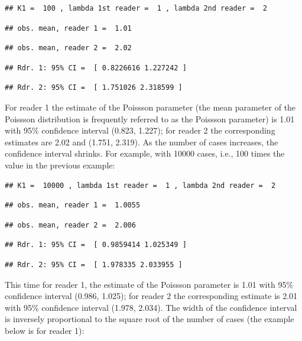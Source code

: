 \documentclass[
]{book}
\begin{document}
\begin{verbatim}
## K1 =  100 , lambda 1st reader =  1 , lambda 2nd reader =  2
\end{verbatim}

\begin{verbatim}
## obs. mean, reader 1 =  1.01
\end{verbatim}

\begin{verbatim}
## obs. mean, reader 2 =  2.02
\end{verbatim}

\begin{verbatim}
## Rdr. 1: 95% CI =  [ 0.8226616 1.227242 ]
\end{verbatim}

\begin{verbatim}
## Rdr. 2: 95% CI =  [ 1.751026 2.318599 ]
\end{verbatim}

For reader 1 the estimate of the Poissson parameter (the mean parameter of the Poissson distribution is frequently referred to as the Poissson parameter) is 1.01 with 95\% confidence interval (0.823, 1.227); for reader 2 the corresponding estimates are 2.02 and (1.751, 2.319). As the number of cases increases, the confidence interval shrinks. For example, with 10000 cases, i.e., 100 times the value in the previous example:

\begin{verbatim}
## K1 =  10000 , lambda 1st reader =  1 , lambda 2nd reader =  2
\end{verbatim}

\begin{verbatim}
## obs. mean, reader 1 =  1.0055
\end{verbatim}

\begin{verbatim}
## obs. mean, reader 2 =  2.006
\end{verbatim}

\begin{verbatim}
## Rdr. 1: 95% CI =  [ 0.9859414 1.025349 ]
\end{verbatim}

\begin{verbatim}
## Rdr. 2: 95% CI =  [ 1.978335 2.033955 ]
\end{verbatim}

This time for reader 1, the estimate of the Poissson parameter is 1.01 with 95\% confidence interval (0.986, 1.025); for reader 2 the corresponding estimate is 2.01 with 95\% confidence interval (1.978, 2.034). The width of the confidence interval is inversely proportional to the square root of the number of cases (the example below is for reader 1):
\end{document}
